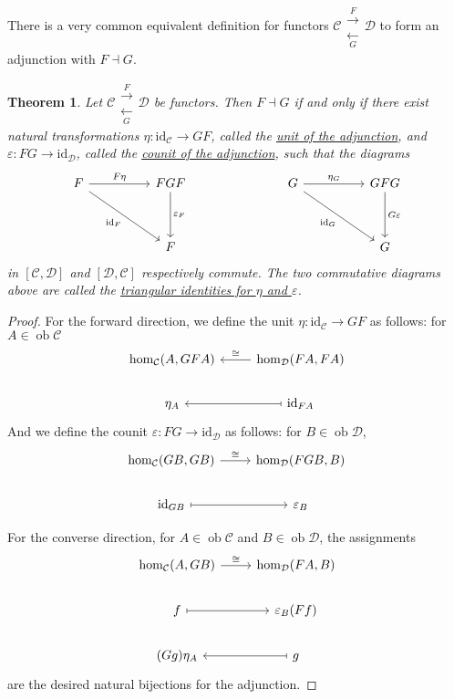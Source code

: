 \documentclass[a4paper,11pt]{article}
\theoremstyle{break_italics}
\newtheorem*{theorem*}{Theorem}
\theoremstyle{break_upright}
\theoremstyle{remark}
\newcommand{\id}{\mathrm{id}}
\newcommand{\ob}{\operatorname{ob}}
\newcommand{\C}{\mathcal{C}}
\newcommand{\D}{\mathcal{D}}
\begin{document}
There is a very common equivalent definition for functors $\C \substack{\xrightarrow{F} \\ \xleftarrow[G]{}} \D$ to form an adjunction with $F \dashv G$.

\begin{theorem*}
Let $\C \substack{\xrightarrow{F} \\ \xleftarrow[G]{}} \D$ be functors. Then $F \dashv G$ if and only if there exist natural transformations $\eta \colon \id_\C \to GF$, called the \uline{unit of the adjunction}, and $\varepsilon \colon FG \to \id_\D$, called the \uline{counit of the adjunction}, such that the diagrams
\[
\begin{tikzcd}
F \arrow[rrdd, "\id_F"'] \arrow[rr, "F\eta"] &  & FGF \arrow[dd, "\varepsilon_F"] &  &  & G \arrow[rrdd, "\id_G"'] \arrow[rr, "\eta_G"] &  & GFG \arrow[dd, "G\varepsilon"] \\
                                             &  &                                 &  &  &                                               &  &                                \\
                                             &  & F                               &  &  &                                               &  & G                             
\end{tikzcd}
\]
in $[\C,\D]$ and $[\D,\C]$ respectively commute. The two commutative diagrams above are called the \uline{triangular identities for $\eta$ and $\varepsilon$}.
\end{theorem*}
\begin{proof}
	For the forward direction, we define the unit $\eta \colon \id_\C \to {GF}$ as follows: for $A \in \ob\C$
	\[
\begin{tikzcd}
{\hom_\C(A, GFA)} & {\hom_\D(FA,FA)} \arrow[l, "\cong"'] \\
\eta_A         & \id_{FA} \arrow[l, maps to]      
\end{tikzcd}
	\]
	And we define the counit $\varepsilon \colon FG \to \id_\D$ as follows: for $B \in \ob\D$,
	\[
\begin{tikzcd}
{\hom_\C(GB, GB)} \arrow[r, "\cong"] & {\hom_\D(FGB,B)} \\
\id_{GB} \arrow[r, maps to]          & \varepsilon_B   
\end{tikzcd}
	\]
	
	For the converse direction, for $A \in \ob\C$ and $B\in\ob\D$, the assignments
	\[
\begin{tikzcd}
{\hom_\C(A, GB)} \arrow[r, "\cong"] & {\hom_\D(FA, B)}     \\
f \arrow[r, maps to]                & \varepsilon_B(Ff)    \\
(Gg)\eta_A                          & g \arrow[l, maps to]
\end{tikzcd}
	\]
	are the desired natural bijections for the adjunction.
\end{proof}
\end{document}
